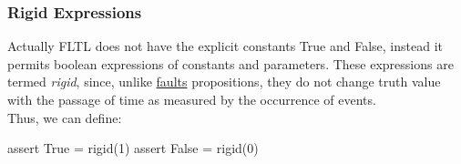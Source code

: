 \subsubsection{Rigid Expressions}\label{sub:an_rigid_expressions} %
Actually FLTL does not have the explicit constants True and False, instead it permits boolean expressions of constants and parameters.
These expressions are termed \textit{rigid}, since, unlike \hyperref[def:fault]{faults} propositions, they do not change truth value with the passage of time as measured by the occurrence of events.
\\
Thus, we can define:
\begin{codeblock}[fsp]{}
    assert True = rigid(1)
    assert False = rigid(0)
\end{codeblock}
